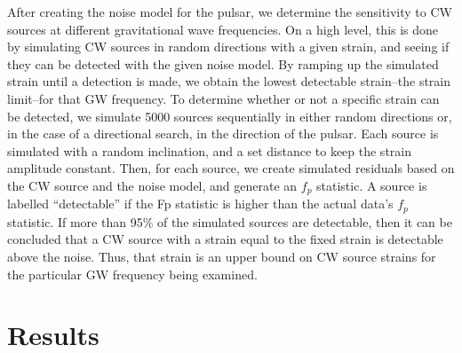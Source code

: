 \documentclass[12pt]{article}
\begin{document}
After creating the noise model for the pulsar, we determine the sensitivity to
CW sources at different gravitational wave frequencies. On a high level, this
is done by simulating CW sources in random directions with a given strain, and
seeing if they can be detected with the given noise model. By ramping up the
simulated strain until a detection is made, we obtain the lowest detectable
strain--the strain limit--for that GW frequency. To determine whether or not a
specific strain can be detected, we simulate 5000 sources sequentially in
either random directions or, in the case of a directional search, in the
direction of the pulsar. Each source is simulated with a random inclination,
and a set distance to keep the strain amplitude constant. Then, for each
source, we create simulated residuals based on the CW source and the noise
model, and generate an $f_p$ statistic. A source is labelled ``detectable'' if the
Fp statistic is higher than the actual data's $f_p$ statistic. If more than 95\% of
the simulated sources are detectable, then it can be concluded that a CW source
with a strain equal to the fixed strain is detectable above the noise. Thus,
that strain is an upper bound on CW source strains for the particular GW
frequency being examined.

\section{Results}
\end{document}
